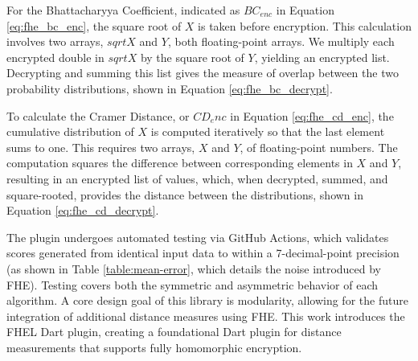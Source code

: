 



For the Bhattacharyya Coefficient, indicated as $BC_{enc}$ in Equation \ref{eq:fhe_bc_enc}, the square root of $X$ is taken before encryption. This calculation involves two arrays, $sqrtX$ and $Y$, both floating-point arrays. We multiply each encrypted double in $sqrtX$ by the square root of $Y$, yielding an encrypted list. Decrypting and summing this list gives the measure of overlap between the two probability distributions, shown in Equation \ref{eq:fhe_bc_decrypt}.





To calculate the Cramer Distance, or $CD_enc$ in Equation \ref{eq:fhe_cd_enc}, the cumulative distribution of $X$ is computed iteratively so that the last element sums to one. This requires two arrays, $X$ and $Y$, of floating-point numbers. The computation squares the difference between corresponding elements in $X$ and $Y$, resulting in an encrypted list of values, which, when decrypted, summed, and square-rooted, provides the distance between the distributions, shown in Equation \ref{eq:fhe_cd_decrypt}.





The plugin undergoes automated testing via GitHub Actions, which validates scores generated from identical input data to within a 7-decimal-point precision (as shown in Table \ref{table:mean-error}, which details the noise introduced by FHE). Testing covers both the symmetric and asymmetric behavior of each algorithm. A core design goal of this library is modularity, allowing for the future integration of additional distance measures using FHE. This work introduces the FHEL Dart plugin, creating a foundational Dart plugin for distance measurements that supports fully homomorphic encryption.
